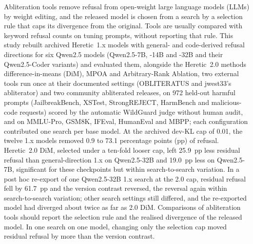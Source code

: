 \noindent Abliteration tools remove refusal from open-weight large language models (LLMs) by weight editing, and the
released model is chosen from a search by a selection rule that caps its divergence from the original. Tools are usually
compared with keyword refusal counts on tuning prompts, without reporting that rule.
This study rebuilt archived Heretic~1.x models with general- and code-derived refusal directions for six Qwen2.5
models (Qwen2.5-7B, -14B and -32B and their Qwen2.5-Coder variants) and evaluated them, alongside the Heretic~2.0 methods
difference-in-means (DiM), MPOA and Arbitrary-Rank Ablation, two external tools run once at their documented settings (OBLITERATUS and jwest33's
abliterator) and two community abliterated releases, on 972 held-out harmful prompts (JailbreakBench, XSTest,
StrongREJECT, HarmBench and malicious-code requests) scored by the automatic WildGuard judge without human audit, and on
MMLU-Pro, GSM8K, IFEval, HumanEval and MBPP; each configuration contributed one search per base model. At the archived
dev-KL cap of 0.01, the twelve 1.x models removed 0.9 to 73.1 percentage points (pp) of refusal. Heretic~2.0 DiM,
selected under a ten-fold looser cap, left 25.9~pp less residual refusal than general-direction 1.x on Qwen2.5-32B and
19.0~pp less on Qwen2.5-7B, significant for these checkpoints but within search-to-search variation. In a post hoc
re-export of one Qwen2.5-32B 1.x search at the 2.0 cap, residual refusal fell by 61.7~pp and the version contrast
reversed, the reversal again within search-to-search variation; other search settings still differed, and the re-exported model had diverged about twice
as far as 2.0 DiM. Comparisons of abliteration tools should report the selection rule and the realised divergence of the
released model. In one search on one model, changing only the selection cap moved residual refusal by more than the
version contrast.
